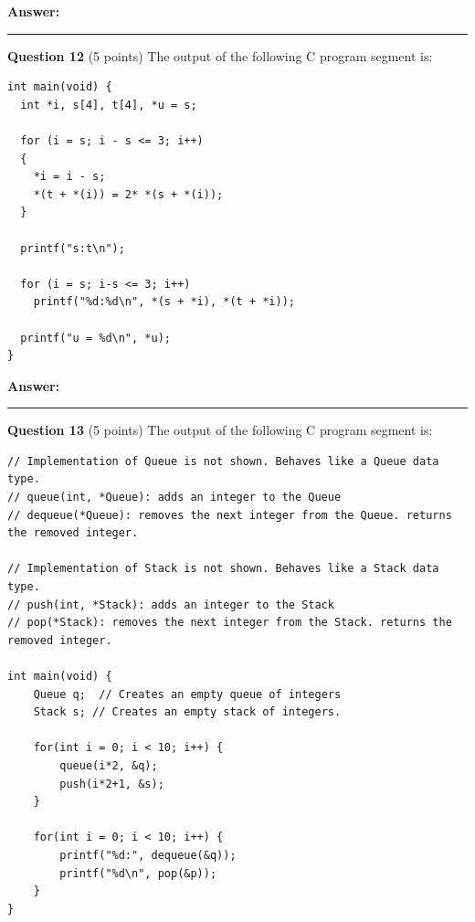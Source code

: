 \documentclass{exam}
\begin{document}
\textbf{Answer:}

\newpage




\begin{center}\noindent\rule{6in}{0.4pt}\end{center}

\textbf{Question 12} (5 points) The output of the following C program segment is:

\begin{lstlisting}
int main(void) {
  int *i, s[4], t[4], *u = s;
  
  for (i = s; i - s <= 3; i++) 
  {
    *i = i - s;
    *(t + *(i)) = 2* *(s + *(i));
  }
  
  printf("s:t\n");
  
  for (i = s; i-s <= 3; i++) 
    printf("%d:%d\n", *(s + *i), *(t + *i));
    
  printf("u = %d\n", *u);
}
\end{lstlisting}

\textbf{Answer:}

\newpage




\begin{center}\noindent\rule{6in}{0.4pt}\end{center}

\textbf{Question 13} (5 points) The output of the following C program segment is:

\begin{lstlisting}
// Implementation of Queue is not shown. Behaves like a Queue data type.
// queue(int, *Queue): adds an integer to the Queue
// dequeue(*Queue): removes the next integer from the Queue. returns the removed integer.

// Implementation of Stack is not shown. Behaves like a Stack data type.
// push(int, *Stack): adds an integer to the Stack
// pop(*Stack): removes the next integer from the Stack. returns the removed integer.

int main(void) {
    Queue q;  // Creates an empty queue of integers
    Stack s; // Creates an empty stack of integers.
    
    for(int i = 0; i < 10; i++) {
        queue(i*2, &q);
        push(i*2+1, &s); 
    }
 
    for(int i = 0; i < 10; i++) {
    	printf("%d:", dequeue(&q));
    	printf("%d\n", pop(&p));
    }
}
\end{lstlisting}
\end{document}
